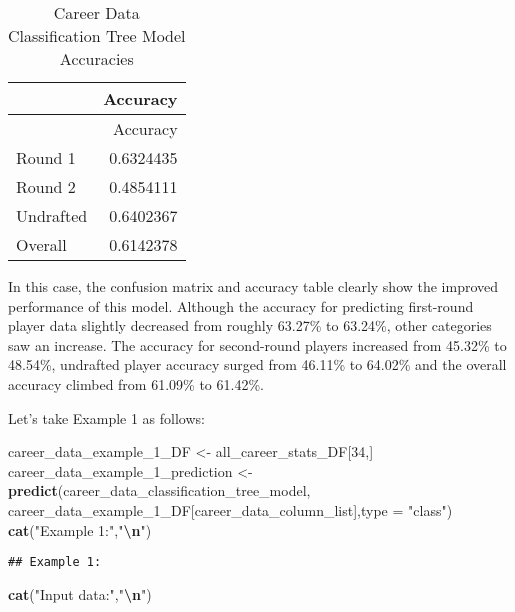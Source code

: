 \documentclass[
]{article}
\newenvironment{Shaded}{\begin{snugshade}}{\end{snugshade}}
\newcommand{\AttributeTok}[1]{\textcolor[rgb]{0.13,0.29,0.53}{#1}}
\newcommand{\DecValTok}[1]{\textcolor[rgb]{0.00,0.00,0.81}{#1}}
\newcommand{\FunctionTok}[1]{\textcolor[rgb]{0.13,0.29,0.53}{\textbf{#1}}}
\newcommand{\NormalTok}[1]{#1}
\newcommand{\OtherTok}[1]{\textcolor[rgb]{0.56,0.35,0.01}{#1}}
\newcommand{\SpecialCharTok}[1]{\textcolor[rgb]{0.81,0.36,0.00}{\textbf{#1}}}
\newcommand{\StringTok}[1]{\textcolor[rgb]{0.31,0.60,0.02}{#1}}
\begin{document}
\begin{longtable}[]{@{}lr@{}}
\caption{Career Data Classification Tree Model
Accuracies}\tabularnewline
\toprule\noalign{}
& Accuracy \\
\midrule\noalign{}
\endfirsthead
\toprule\noalign{}
& Accuracy \\
\midrule\noalign{}
\endhead
\bottomrule\noalign{}
\endlastfoot
Round 1 & 0.6324435 \\
Round 2 & 0.4854111 \\
Undrafted & 0.6402367 \\
Overall & 0.6142378 \\
\end{longtable}

In this case, the confusion matrix and accuracy table clearly show the
improved performance of this model. Although the accuracy for predicting
first-round player data slightly decreased from roughly 63.27\% to
63.24\%, other categories saw an increase. The accuracy for second-round
players increased from 45.32\% to 48.54\%, undrafted player accuracy
surged from 46.11\% to 64.02\% and the overall accuracy climbed from
61.09\% to 61.42\%.

Let's take Example 1 as follows:

\begin{Shaded}
\begin{Highlighting}[]
\NormalTok{career\_data\_example\_1\_DF }\OtherTok{\textless{}{-}}\NormalTok{ all\_career\_stats\_DF[}\DecValTok{34}\NormalTok{,]}
\NormalTok{career\_data\_example\_1\_prediction }\OtherTok{\textless{}{-}} \FunctionTok{predict}\NormalTok{(career\_data\_classification\_tree\_model,}
\NormalTok{                career\_data\_example\_1\_DF[career\_data\_column\_list],}\AttributeTok{type =} \StringTok{"class"}\NormalTok{)}
\FunctionTok{cat}\NormalTok{(}\StringTok{"Example 1:"}\NormalTok{,}\StringTok{"}\SpecialCharTok{\textbackslash{}n}\StringTok{"}\NormalTok{)}
\end{Highlighting}
\end{Shaded}

\begin{verbatim}
## Example 1:
\end{verbatim}

\begin{Shaded}
\begin{Highlighting}[]
\FunctionTok{cat}\NormalTok{(}\StringTok{"Input data:"}\NormalTok{,}\StringTok{"}\SpecialCharTok{\textbackslash{}n}\StringTok{"}\NormalTok{)}
\end{Highlighting}
\end{Shaded}
\end{document}
